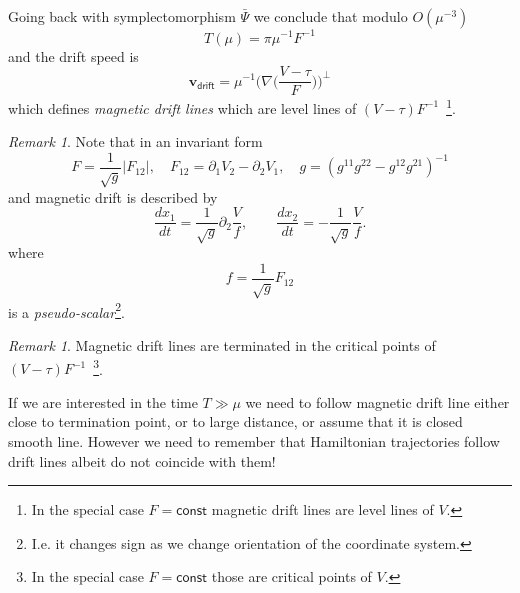 \documentclass[12pt,oneside,openany,article]{memoir}
\numberwithin{equation}{chapter}
\theoremstyle{plain}
\theoremstyle{definition}
\theoremstyle{remark}
\newtheorem{remark}[theorem]{Remark}
\numberwithin{equation}{chapter}
\newcounter{note}
\begin{document}
Going back with symplectomorphism $\bar{\Psi}$ we conclude that modulo $O(\mu^{-3})$
\begin{equation}
T(\mu)=\pi \mu^{-1}F^{-1}
\label{13-6-2}
\end{equation}
and the drift speed is
\begin{equation}
\mathbf{v}_{\mathsf{drift}}= \mu^{-1}\bigl(\nabla \bigl(\frac{V-\tau}{F}\bigr)\bigr)^\perp
\label{13-6-3}
\end{equation}
which defines \emph{magnetic drift lines\/} which are level lines of
$(V-\tau)F^{-1}$~\footnote{\label{foot-13-34} In the special case $F={{\mathsf{const}}}$ magnetic drift lines are level lines of $V$.}.

\begin{remark}\label{rem-13-6-1}
Note that in an invariant form
\begin{equation}
F= \frac{1}{\sqrt{g}} |F_{12}|,\quad F_{12}=\partial_1 V_2-\partial_2 V_1,\quad
g= (g^{11}g^{22}-g^{12}g^{21})^{-1}
\label{13-6-4}
\end{equation}
and magnetic drift is described by
\begin{equation}
\frac{dx_1}{dt}= \frac{1}{\sqrt g} \partial_2 \frac{V}{f},\qquad
\frac{dx_2}{dt}= -\frac{1}{\sqrt g} \frac{V}{f}.
\label{13-6-5}
\end{equation}
where
\begin{equation}
f=\frac{1}{\sqrt{g}} F_{12}
\label{13-6-6}
\end{equation}
is a \emph{pseudo-scalar\/}\footnote{\label{foot-13-35} I.e. it changes sign as we change orientation of the coordinate system.}.
\end{remark}

\begin{remark}\label{rem-13-6-2}
Magnetic drift lines are terminated in the critical points of $(V-\tau)F^{-1}$~\footnote{\label{foot-13-36} In the special case $F={{\mathsf{const}}}$ those are critical points of $V$.}.
\end{remark}

If we are interested in the time $T\gg \mu$ we need to follow magnetic drift line either close to termination point, or to large distance, or assume that it is closed smooth line. However we need to remember that Hamiltonian trajectories follow drift lines albeit do not coincide with them!
\end{document}
